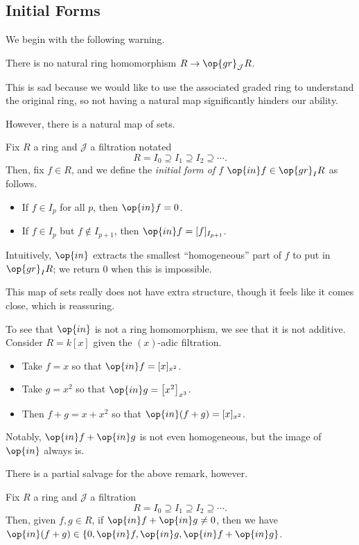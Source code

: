 \subsection{Initial Forms}
We begin with the following warning.
\begin{warn}
	There is no natural ring homomorphism $R\to\op{gr}_{\mathcal J}R$.
\end{warn}
This is sad because we would like to use the associated graded ring to understand the original ring, so not having a natural map significantly hinders our ability.

However, there is a natural map of sets.
\begin{definition}
	Fix $R$ a ring and $\mathcal J$ a filtration notated
	\[R=I_0\supseteq I_1\supseteq I_2\supseteq\cdots.\]
	Then, fix $f\in R$, and we define the \textit{initial form of $f$} $\op{in}f\in\op{gr}_IR$ as follows.
	\begin{itemize}
		\item If $f\in I_p$ for all $p$, then $\op{in}f=0$.
		\item If $f\in I_p$ but $f\notin I_{p+1}$, then $\op{in}f=[f]_{I_{p+1}}$.
	\end{itemize}
	Intuitively, $\op{in}$ extracts the smallest ``homogeneous'' part of $f$ to put in $\op{gr}_IR$; we return $0$ when this is impossible.
\end{definition}
This map of sets really does not have extra structure, though it feels like it comes close, which is reassuring.
\begin{remark}[Nir]
	To see that $\op{in}$ is not a ring homomorphism, we see that it is not additive. Consider $R=k[x]$ given the $(x)$-adic filtration.
	\begin{itemize}
		\item Take $f=x$ so that $\op{in}f=[x]_{x^2}$.
		\item Take $g=x^2$ so that $\op{in}g=\left[x^2\right]_{x^3}$.
		\item Then $f+g=x+x^2$ so that $\op{in}(f+g)=[x]_{x^2}$.
	\end{itemize}
	Notably, $\op{in}f+\op{in}g$ is not even homogeneous, but the image of $\op{in}$ always is.
\end{remark}
There is a partial salvage for the above remark, however.
\begin{proposition}
	Fix $R$ a ring and $\mathcal J$ a filtration
	\[R=I_0\supseteq I_1\supseteq I_2\supseteq\cdots.\]
	Then, given $f,g\in R$, if $\op{in}f+\op{in}g\ne0$, then we have $\op{in}(f+g)\in\{0,\op{in}f,\op{in}g,\op{in}f+\op{in}g\}$.
\end{proposition}
